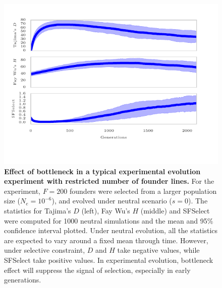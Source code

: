 \begin{figure}[H]
	\centering 
	\includegraphics[trim=3.2in 0.1in 3.2in 0.2in , 
	clip,width=\textwidth]{figures/bottleneck}
	\caption{{\bf Effect of bottleneck in a typical experimental
			evolution experiment with restricted number of founder
			lines.} For the experiment, $F=200$ founders were selected
		from a larger population size ($N_e=10^{-6}$), and evolved
		under neutral scenario ($s=0$). The statistics for
		Tajima's $D$ (left), Fay Wu's $H$ (middle) and SFSelect were
		computed for 1000 neutral simulations and the mean and 95\%
		confidence interval plotted. Under neutral evolution, all
		the statistics are expected to vary around a fixed mean
		through time. However, under selective constraint, $D$ and
		$H$ take negative values, while SFSelect take positive
		values. In experimental evolution, bottleneck effect will
		suppress the signal of selection, especially in early
		generations. }
	\label{fig:bottleneck}
\end{figure}



